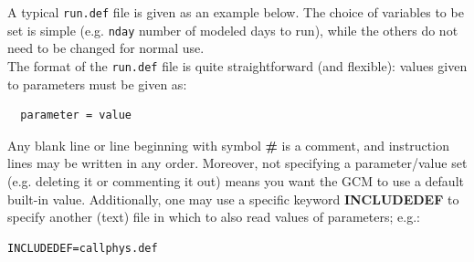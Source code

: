 A typical {\tt run.def} file is given as an example below.
The choice of variables to be set is simple (e.g.
 {\tt nday} number of modeled days to run),
while the others do not need to be changed for normal use.\\
The format of the {\tt run.def} file is quite straightforward
(and flexible): values given to parameters must be given as:
\begin{verbatim}
  parameter = value
\end{verbatim}
Any blank line or line beginning with symbol {\bf \#} is
a comment, and instruction lines may be written in any order.
Moreover, not specifying a parameter/value set (e.g. deleting it
or commenting it out) means you want the GCM to use a default built-in value.
Additionally, one may use a specific keyword {\bf INCLUDEDEF} to specify
another (text) file in which to also read values of parameters; e.g.:
\begin{verbatim}
INCLUDEDEF=callphys.def
\end{verbatim}


